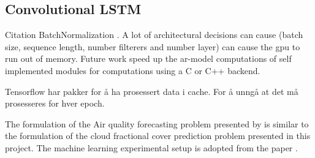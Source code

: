 \begin{table}[h]
    \centering
    \caption{Configuration of \acrshort{ar}-models. $\times$ denoted not applied, \checked denotes applied \textbf{add bias??} Gi modellen navn basert på configurasjonen $AR_{STEx}$ where x is the order.}
    \label{tab:ar_model_config}
\end{table}

\subsection{Convolutional LSTM}
Citation BatchNormalization \cite{ioffe2015batch}. 
A lot of architectural decisions can cause (batch size, sequence length, number filterers and number layer) can cause the \acrshort{gpu} to run out of memory. Future work speed up the \acrshort{ar}-model computations of self implemented modules for computations using  a C or C++ backend.

Tensorflow har pakker for å ha prosessert data i cache. For å unngå at det må prosesseres for hver epoch. 



The formulation of the Air quality forecasting problem presented by  \citeauthor{SunAirLSTM} is similar to the formulation of the cloud fractional cover prediction problem presented in this project. The machine learning experimental setup is adopted from the paper . 


